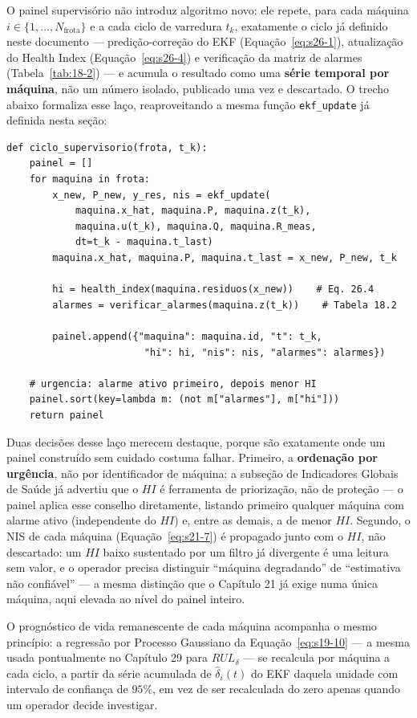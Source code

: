 \documentclass[12pt,a4paper]{article}
\numberwithin{equation}{section}
\numberwithin{table}{section}
\numberwithin{figure}{section}
\begin{document}
	O painel supervisório não introduz algoritmo novo: ele repete, para cada máquina $i \in \{1, \dots, N_{\text{frota}}\}$ e a cada ciclo de varredura $t_k$, exatamente o ciclo já definido neste documento — predição-correção do EKF (Equação~\eqref{eq:s26-1}), atualização do Health Index (Equação~\eqref{eq:s26-4}) e verificação da matriz de alarmes (Tabela~\ref{tab:18-2}) — e acumula o resultado como uma \textbf{série temporal por máquina}, não um número isolado, publicado uma vez e descartado. O trecho abaixo formaliza esse laço, reaproveitando a mesma função \texttt{ekf\_update} já definida nesta seção:

	\begin{verbatim}
def ciclo_supervisorio(frota, t_k):
    painel = []
    for maquina in frota:
        x_new, P_new, y_res, nis = ekf_update(
            maquina.x_hat, maquina.P, maquina.z(t_k),
            maquina.u(t_k), maquina.Q, maquina.R_meas,
            dt=t_k - maquina.t_last)
        maquina.x_hat, maquina.P, maquina.t_last = x_new, P_new, t_k

        hi = health_index(maquina.residuos(x_new))    # Eq. 26.4
        alarmes = verificar_alarmes(maquina.z(t_k))    # Tabela 18.2

        painel.append({"maquina": maquina.id, "t": t_k,
                        "hi": hi, "nis": nis, "alarmes": alarmes})

    # urgencia: alarme ativo primeiro, depois menor HI
    painel.sort(key=lambda m: (not m["alarmes"], m["hi"]))
    return painel
	\end{verbatim}

	Duas decisões desse laço merecem destaque, porque são exatamente onde um painel construído sem cuidado costuma falhar. Primeiro, a \textbf{ordenação por urgência}, não por identificador de máquina: a subseção de Indicadores Globais de Saúde já advertiu que o $HI$ é ferramenta de priorização, não de proteção — o painel aplica esse conselho diretamente, listando primeiro qualquer máquina com alarme ativo (independente do $HI$) e, entre as demais, a de menor $HI$. Segundo, o NIS de cada máquina (Equação~\eqref{eq:s21-7}) é propagado junto com o $HI$, não descartado: um $HI$ baixo sustentado por um filtro já divergente é uma leitura sem valor, e o operador precisa distinguir ``máquina degradando'' de ``estimativa não confiável'' — a mesma distinção que o Capítulo 21 já exige numa única máquina, aqui elevada ao nível do painel inteiro.

	O prognóstico de vida remanescente de cada máquina acompanha o mesmo princípio: a regressão por Processo Gaussiano da Equação~\eqref{eq:s19-10} — a mesma usada pontualmente no Capítulo 29 para $RUL_\delta$ — se recalcula por máquina a cada ciclo, a partir da série acumulada de $\hat\delta_i(t)$ do EKF daquela unidade com intervalo de confiança de $95\%$, em vez de ser recalculada do zero apenas quando um operador decide investigar.
\end{document}

